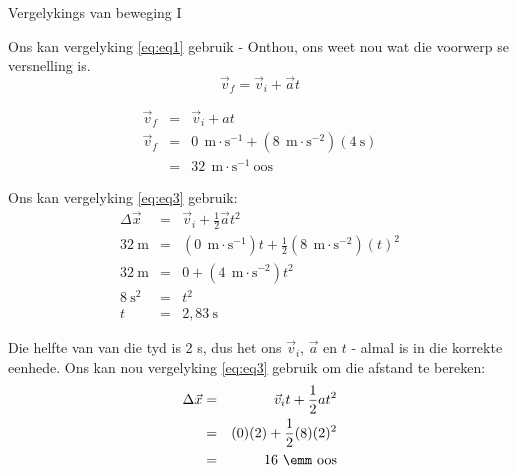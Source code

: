 \begin{wex}{Vergelykings van beweging I}
{ 
Ons kan vergelyking \ref{eq:eq1} gebruik - Onthou, ons weet nou wat die voorwerp se versnelling is.
\begin{displaymath}
\vec{v}_f = \vec{v}_i + \vec{a}t
\end{displaymath}

\begin{eqnarray*}
\vec{v}_f &=& \vec{v}_i + at\\
\vec{v}_f &=& 0\ ~\text{m}\cdot \text{s}^{-1} +(8\ ~\text{m}\cdot \text{s}^{-2})(4\ \text{s})\\
&=&32\ ~\text{m}\cdot \text{s}^{-1}~\text{oos}
\end{eqnarray*}

Ons kan vergelyking \ref{eq:eq3} gebruik:
\begin{eqnarray*}
\Delta \vec{x} &=& \vec{v}_i + \frac{1}{2}\vec{a}t^2\\
32\ \text{m} &=& (0\ ~\text{m}\cdot \text{s}^{-1})t + \frac{1}{2}(8\ ~\text{m}\cdot \text{s}^{-2})(t)^2\\
32\ \text{m} &=& 0 + (4\ ~\text{m}\cdot \text{s}^{-2})t^2\\
8\ \text{s}^2 &=& t^2\\
t &=& 2,83~\text{s}
\end{eqnarray*}

Die helfte van van die tyd is 2 s, dus het ons $\vec{v}_i$, $\vec{a}$ en $t$ - almal is in die korrekte eenhede. Ons kan nou vergelyking \ref{eq:eq3} gebruik om die afstand te bereken:
\begin{eqnarray*}
\Delta \vec{x}&=&\vec{v}_it+\frac{1}{2}at^2\\
&=&(0)(2)+\frac{1}{2}(8)(2)^2\\
&=&16\ \emm~\text{oos}
\end{eqnarray*}
}
\end{wex}


